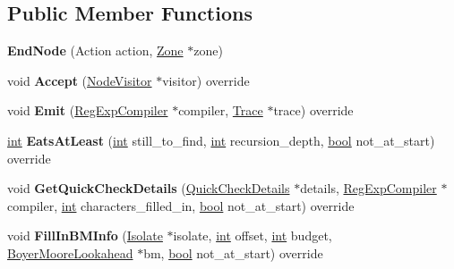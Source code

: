\subsection*{Public Member Functions}
\begin{DoxyCompactItemize}
\item 
\mbox{\label{classv8_1_1internal_1_1EndNode_a83274b03e3eb90631e8e6cbe6304bd7b}} 
{\bfseries End\+Node} (Action action, \mbox{\hyperlink{classv8_1_1internal_1_1Zone}{Zone}} $\ast$zone)
\item 
\mbox{\label{classv8_1_1internal_1_1EndNode_a372d8988a10aebff4d6a18b6be41a2f8}} 
void {\bfseries Accept} (\mbox{\hyperlink{classv8_1_1internal_1_1NodeVisitor}{Node\+Visitor}} $\ast$visitor) override
\item 
\mbox{\label{classv8_1_1internal_1_1EndNode_a66ababf835a989d72f0f5a674acffe3a}} 
void {\bfseries Emit} (\mbox{\hyperlink{classv8_1_1internal_1_1RegExpCompiler}{Reg\+Exp\+Compiler}} $\ast$compiler, \mbox{\hyperlink{classv8_1_1internal_1_1Trace}{Trace}} $\ast$trace) override
\item 
\mbox{\label{classv8_1_1internal_1_1EndNode_a2f6fd19ec92c603cea64eec5ad8db09a}} 
\mbox{\hyperlink{classint}{int}} {\bfseries Eats\+At\+Least} (\mbox{\hyperlink{classint}{int}} still\+\_\+to\+\_\+find, \mbox{\hyperlink{classint}{int}} recursion\+\_\+depth, \mbox{\hyperlink{classbool}{bool}} not\+\_\+at\+\_\+start) override
\item 
\mbox{\label{classv8_1_1internal_1_1EndNode_ab1c81a19575a674c5fcc50a7d886c846}} 
void {\bfseries Get\+Quick\+Check\+Details} (\mbox{\hyperlink{classv8_1_1internal_1_1QuickCheckDetails}{Quick\+Check\+Details}} $\ast$details, \mbox{\hyperlink{classv8_1_1internal_1_1RegExpCompiler}{Reg\+Exp\+Compiler}} $\ast$compiler, \mbox{\hyperlink{classint}{int}} characters\+\_\+filled\+\_\+in, \mbox{\hyperlink{classbool}{bool}} not\+\_\+at\+\_\+start) override
\item 
\mbox{\label{classv8_1_1internal_1_1EndNode_a4e7515e0d715f45c5bea910368e1134e}} 
void {\bfseries Fill\+In\+B\+M\+Info} (\mbox{\hyperlink{classv8_1_1internal_1_1Isolate}{Isolate}} $\ast$isolate, \mbox{\hyperlink{classint}{int}} offset, \mbox{\hyperlink{classint}{int}} budget, \mbox{\hyperlink{classv8_1_1internal_1_1BoyerMooreLookahead}{Boyer\+Moore\+Lookahead}} $\ast$bm, \mbox{\hyperlink{classbool}{bool}} not\+\_\+at\+\_\+start) override
\end{DoxyCompactItemize}
